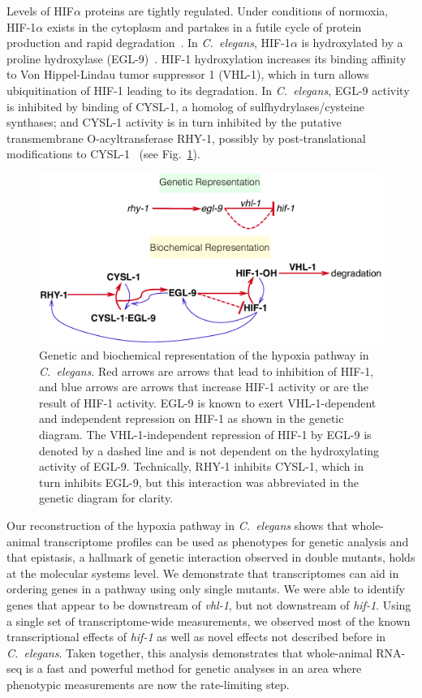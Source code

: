\documentclass[9pt,twocolumn,twoside]{pnas-new}
\newcommand{\cel}{\emph{C.~elegans}}
\newcommand{\gene}[1]{\mbox{\emph{#1}}}
\newcommand{\eglp}{EGL-9}
\newcommand{\rhyp}{RHY-1}
\newcommand{\vhlp}{VHL-1}
\newcommand{\hifp}{HIF-1}
\newcommand{\cyslp}{CYSL-1}
\begin{document}
Levels of HIF$\alpha$ proteins are tightly regulated. Under conditions of
normoxia, \hifp{}$\alpha$ exists in the cytoplasm and partakes in a futile cycle
of protein production and rapid degradation~\cite{Huang1996}. In \cel{},
\hifp{}$\alpha$ is hydroxylated by a proline hydroxylase
(\eglp{})~\cite{Kaelin2008}. \hifp{} hydroxylation increases its binding
affinity to Von Hippel-Lindau tumor suppressor 1 (\vhlp{}), which in turn allows
ubiquitination of \hifp{} leading to its degradation. In \cel{},
\eglp{} activity is inhibited by binding of \cyslp{}, a homolog of
sulfhydrylases/cysteine synthases; and \cyslp{} activity is in turn inhibited by
the putative transmembrane O-acyltransferase \rhyp{}, possibly by
post-translational modifications to \cyslp{}~\cite{Ma2012} (see
Fig.~\ref{fig:pathway}).

\begin{figure}[tbhp]
  \centering
  \includegraphics[width=\linewidth]{../figs/HIF1pathway.pdf}
  \caption{
    Genetic and biochemical representation of the hypoxia pathway in \cel{}. Red
    arrows are arrows that lead to inhibition of \hifp{}, and blue arrows are
    arrows that increase \hifp{} activity or are the result of \hifp{} activity.
    \eglp{} is known to exert \vhlp{}-dependent and independent repression
    on \hifp{} as shown in the genetic diagram. The \vhlp{}-independent
    repression of \hifp{} by \eglp{} is denoted by a dashed line and is not
    dependent on the hydroxylating activity of \eglp{}. Technically, RHY-1
    inhibits CYSL-1, which in turn inhibits EGL-9, but this interaction was
    abbreviated in the genetic diagram for clarity.
  }
\label{fig:pathway}
\end{figure}

Our reconstruction of the hypoxia pathway in \cel{} shows
that whole-animal transcriptome profiles can be used as phenotypes for genetic
analysis and that epistasis, a hallmark of genetic interaction
observed in double mutants, holds at the molecular systems level. We demonstrate
that transcriptomes can aid in ordering genes in a pathway using only single
mutants. We were able to identify genes that appear to be downstream of
\gene{vhl-1}, but not downstream of \gene{hif-1}.
Using a single set of transcriptome-wide measurements, we observed most of the
known transcriptional effects of \gene{hif-1} as well as novel effects not
described before in \cel{}. Taken together, this analysis demonstrates that
whole-animal RNA-seq is a fast and powerful method for genetic
analyses in an area where phenotypic measurements are now the rate-limiting
step.
\end{document}
